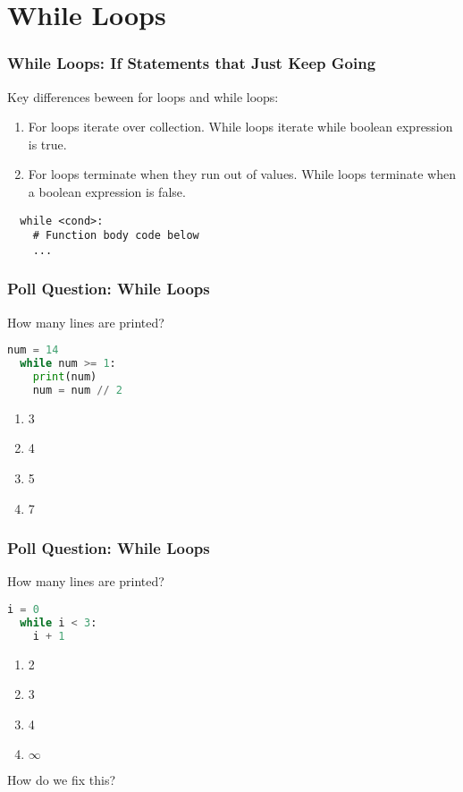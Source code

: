 \documentclass{beamer}
\begin{document}
\section{While Loops}

%
%
%
\begin{frame}[fragile]
  \frametitle{While Loops: If Statements that Just Keep Going}
    Key differences beween for loops and while loops:
    \begin{enumerate}
      \item For loops iterate over collection. While loops iterate while boolean expression is true.
      \item For loops terminate when they run out of values. While loops terminate when a boolean expression is false.
    \end{enumerate}
    \vfill
  \begin{lstlisting}
  while <cond>:
    # Function body code below
    ...
  \end{lstlisting}
\end{frame}

%
%
\begin{frame}[fragile]
  \frametitle{Poll Question: While Loops}
  How many lines are printed?
  \begin{lstlisting}[language=Python, autogobble]
  num = 14
  while num >= 1:
    print(num)
    num = num // 2
  \end{lstlisting}
  \vfill
  \begin{enumerate}[A]
    \item 3
    \item 4
    \item 5
    \item 7
  \end{enumerate}
\end{frame}

%
%
\begin{frame}[fragile]
  \frametitle{Poll Question: While Loops}
  How many lines are printed?
  \begin{lstlisting}[language=Python, autogobble]
  i = 0 
  while i < 3:
    i + 1
  \end{lstlisting}
  \vfill
  \begin{enumerate}[A]
    \item 2
    \item 3
    \item 4
    \item $\infty$
  \end{enumerate}
  \pause
  How do we fix this?
\end{frame}
\end{document}
